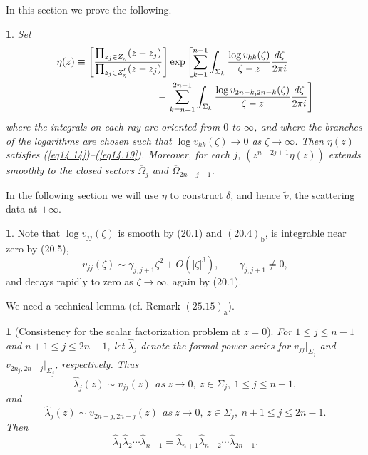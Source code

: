 \documentclass{surv-l}
\theoremstyle{plain}
\newtheorem{prop}[theorem]{\sc{Proposition}}
\newtheorem{lemma}[theorem]{\sc{Lemma}}
\theoremstyle{definition}
\newtheorem{remark}[theorem]{\sc{Remark}}
\numberwithin{equation}{chapter}
\begin{document}
In this section we prove the following.
\renewcommand\thetheorem{31.\arabic{theorem}}
\setcounter{theorem}{2}
\begin{prop}\label{prop31.3}
Set
\setcounter{equation}{3}
\begin{align}\label{eq31.4}
  & \eta(z)\equiv\left[\frac{\prod_{z_{j}\in Z_{\eta}}(z-z_{j})}{\prod_{z_{j}\in Z_{\eta}^{'}}(z-z_{j})}\right]\exp\left[\sum_{k=1}^{n-1}\int_{\Sigma_{k}}\frac{\log v_{kk}(\zeta)}{\zeta-z}\frac{d{\zeta}}{2\pi i}\right.\\ \notag
&\qquad\qquad\qquad\qquad\qquad-\left.\sum_{k=n+1}^{2n-1}\int_{\Sigma_{k}}\frac{\log v_{2n-k,2n-k}(\zeta)}{\zeta-z}\frac{d{\zeta}}{2\pi i}\right]
\end{align}
where the integrals on each ray are oriented from $0$ to $\infty$,
and where the branches of the logarithms are chosen such that $\log v_{kk}(\zeta)\rightarrow 0$ as $\zeta \rightarrow\infty$. Then $\eta(z)$ satisfies
\emph{(\ref{eq14.14})}--\emph{(\ref{eq14.19})}. Moreover, for each $j$, $(z^{n-2j+1}\eta(z))$ extends smoothly to the closed sectors $\overline{\Omega}_{j}$ and $\overline{\Omega}_{2n-j+1}$.
\end{prop}
In the following section we will use $\eta$ to construct $\delta$, and hence $\tilde{v}$, the scattering data at $+\infty$.
\setcounter{theorem}{4}
\begin{remark}\label{rem31.5}
Note that $\log v_{jj}(\zeta)$ is smooth by (20.1) and $(20.4)_{\mathrm{b}}$, is integrable near zero by (20.5),
\begin{equation*}
v_{jj}(\zeta)\sim\gamma_{j,j+1}\zeta^{2}+O(|\zeta|^{3}),\qquad \gamma_{j, j+1}\neq 0,
\end{equation*}
and decays rapidly to zero as $\zeta \rightarrow\infty$, again by (20.1).

We need a technical lemma (cf. Remark $(25.15)_{\mathrm{a}}$).
\end{remark}
\begin{lemma}[Consistency for the scalar factorization problem at $z=0$]\label{lem31.6}
For $1\leq j\leq n-1$ and $n+1\leq j\leq 2n-1$, let $\hat{\lambda}_{j}$ denote the formal power series for $v_{j j}|_{{\Sigma}_{j}}$ and $v_{2n_{j},2n-j}|_{{\Sigma}_{j}}$, respectively. Thus
\setcounter{equation}{6}
\begin{equation}\label{eq31.7}
\hat{\lambda}_{j}(z)\sim v_{jj}(z)\ \ as\ z\rightarrow 0,\ z\in{\Sigma}_{j},\ 1\leq j\leq n -1,
\end{equation}
and
\begin{equation}\label{eq31.8}
\hat{\lambda}_{j}(z)\sim v_{2n-j,2n-j}(z)\ \ as\ z\rightarrow 0,\ z\in{\Sigma}_{j},\ n+1\leq j\leq 2n-1.
\end{equation}
Then
\begin{equation}\label{eq31.9}
\hat{\lambda}_{1}\hat{\lambda}_{2}\cdots\hat{\lambda}_{n-1}=\hat{\lambda}_{n+1}\hat{\lambda}_{n+2}\cdots\hat{\lambda}_{2n-1}.
\end{equation}
\end{lemma}
\end{document}

